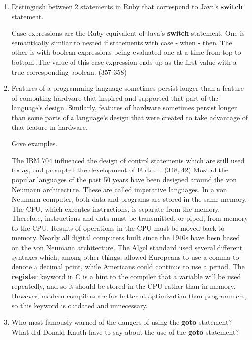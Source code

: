 \begin{enumerate}
  \item Distinguish between 2 statements in Ruby
    that correspond to Java's \textbf{switch} statement.

 \begin{answer}
    Case expressions are the Ruby equivalent of Java's \textbf{switch} statement. One is semantically similar to nested if statements with case - when - then. The other is with boolean expressions being evaluated one at a time from top to bottom .The value of this case expression ends up as the first value with a true corresponding boolean. (357-358)
     \end{answer}

  \item Features of a programming language sometimes persist
    longer than a feature of computing hardware that inspired
    and supported that part of the language's design.
    Similarly, features of hardware sometimes persist longer
    than some parts of a language's design that were created
    to take advantage of that feature in hardware.

    Give examples.

 \begin{answer}
    The IBM 704 influenced the design of control statements which are still used today, and prompted the development of Fortran. (348, 42)
    Most of the popular languages of the past 50 years have been designed around the von Neumann architecture. These are called imperative languages. In a von Neumann computer, both data and programs are stored in the same memory. The CPU, which executes instructions, is separate from the memory. Therefore, instructions and data must be transmitted, or piped, from memory to the CPU. Results of operations in the CPU must be moved back to memory. Nearly all digital computers built since the 1940s have been based on the von Neumann architecture.
The Algol standard used several different syntaxes which, among other things, allowed Europeans to use a comma to denote a decimal point, while Americans could continue to use a period.
  The \textbf{register} keyword in C is a hint to the compiler that a variable will be used repeatedly, and so it should be stored in the CPU rather than in memory. However, modern compilers are far better at optimization than programmers, so this keyword is outdated and unnecessary.
     \end{answer}

  \item Who most famously warned of the dangers of using the
    \textbf{goto} statement? What did Donald Knuth have to
    say about the use of the \textbf{goto} statement?


\end{enumerate}
